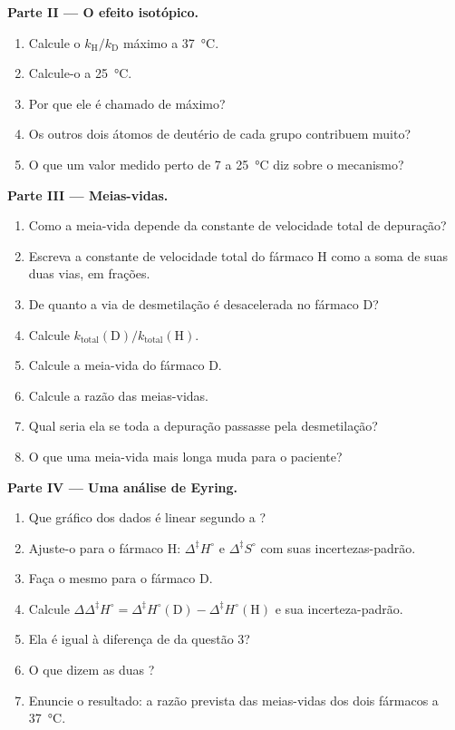 \begin{problem}
\medskip\noindent\textbf{Parte II --- O efeito isotópico.}
\begin{enumerate}[resume]
  \item Calcule o $k_{\mathrm H}/k_{\mathrm D}$ máximo a \qty{37}{\celsius}.
  \item Calcule-o a \qty{25}{\celsius}.
  \item Por que ele é chamado de máximo?
  \item Os outros dois átomos de deutério de cada grupo  contribuem muito?
  \item O que um valor medido perto de 7 a \qty{25}{\celsius} diz sobre o
        mecanismo?
\end{enumerate}

\medskip\noindent\textbf{Parte III --- Meias-vidas.}
\begin{enumerate}[resume]
  \item Como a meia-vida depende da constante de velocidade total de depuração?
  \item Escreva a constante de velocidade total do fármaco H como a soma de suas
        duas vias, em frações.
  \item De quanto a via de desmetilação é desacelerada no fármaco D?
  \item Calcule $k_{\mathrm{total}}(\mathrm D)/k_{\mathrm{total}}(\mathrm H)$.
  \item Calcule a meia-vida do fármaco D.
  \item Calcule a razão das meias-vidas.
  \item Qual seria ela se toda a depuração passasse pela desmetilação?
  \item O que uma meia-vida mais longa muda para o paciente?
\end{enumerate}

\medskip\noindent\textbf{Parte IV --- Uma análise de Eyring.}
\begin{enumerate}[resume]
  \item Que gráfico dos dados é linear segundo a ?
  \item Ajuste-o para o fármaco H: $\Delta^{\ddagger}H^\circ$ e $\Delta^{\ddagger}S^\circ$ com suas incertezas-padrão.
  \item Faça o mesmo para o fármaco D.
  \item Calcule $\Delta\Delta^{\ddagger}H^\circ = \Delta^{\ddagger}H^\circ(\mathrm D) - \Delta^{\ddagger}H^\circ(\mathrm H)$ e sua incerteza-padrão.
  \item Ela é igual à diferença de  da questão 3?
  \item O que dizem as duas ?
  \item Enuncie o resultado: a razão prevista das meias-vidas dos dois fármacos
        a \qty{37}{\celsius}.
\end{enumerate}
\end{problem}
